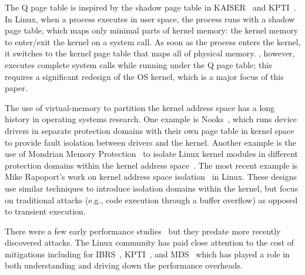 The Q page table is inspired by the shadow page table in
KAISER~\cite{gruss:kaiser} and KPTI~\cite{linux:kpti}. In Linux, when
a process executes in user space, the process runs with a shadow
page table, which maps only minimal parts of kernel memory: the kernel
memory to enter/exit the kernel on a system call. As soon as the process
enters the kernel, it switches to the kernel page table that maps all
of physical memory.  \sys, however, executes complete system
calls while running under the Q page table; this requires a significant
redesign of the OS kernel, which is a major focus of this paper.

The use of virtual-memory to partition the kernel address space has a
long history in operating systems research.  One example is
Nooks~\cite{swift:nooks-tocs}, which runs device drivers in separate
protection domains with their own page table in kernel space to
provide fault isolation between drivers and the kernel.  Another
example is the use of Mondrian Memory Protection~\cite{witchel:mmp} to
isolate Linux kernel modules in different protection domains within
the kernel address space~\cite{witchel:mondrix}.  The most
recent example is Mike Rapoport's work on kernel address space
isolation~\cite{lwn:beyond-kpti} in Linux.  These designs use similar
techniques to introduce isolation domains within the kernel, but focus
on traditional attacks (e.g., code execution through a buffer overflow)
as opposed to transient execution.



There were a few early performance studies~\cite{nikolay:meltdown-spectre-performance,prout:measuring-spectre-meltdown} but they predate more recently discovered attacks.
The Linux community has paid close attention to the cost of mitigations including for IBRS~\cite{linus:ibrs-rant},  KPTI~\cite{gregg:kpti-perfromance}, and MDS~\cite{larabel:perf-zombieload} which has played a role in both understanding and driving down the performance overheads.




